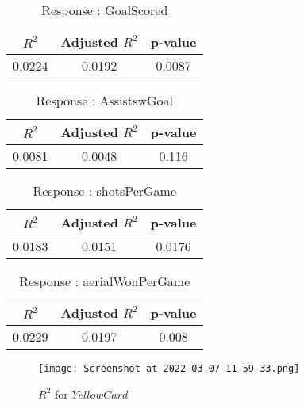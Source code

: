 \documentclass[12pt]{article}
\begin{document}
\begin{minipage}{0.5\textwidth}
	\begin{table}[H]
	\centering
	\caption{Response : GoalScored}\label{table:1a}
	{\begin{tabular}{|c|c|c|}
			\hline
			$ R^2 $ & Adjusted $ R^2 $ & p-value \\
			\hline
			0.0224 & 0.0192 & 0.0087 \\
			\hline
		\end{tabular}
	}
\end{table}
\begin{table}[H]
	\centering
	\caption{Response : AssistswGoal}\label{table:1a}
	{\begin{tabular}{|c|c|c|}
			\hline
			$ R^2 $ & Adjusted $ R^2 $ & p-value \\
			\hline
			0.0081 & 0.0048 & 0.116 \\
			\hline
		\end{tabular}
	}
\end{table}
\end{minipage}
\hfill
\begin{minipage}{0.5\textwidth}
	\begin{table}[H]
	\centering
	\caption{Response : shotsPerGame }\label{table:1a}
	{\begin{tabular}{|c|c|c|}
			\hline
			$ R^2 $ & Adjusted $ R^2 $ & p-value \\
			\hline
			0.0183 & 0.0151 & 0.0176 \\
			\hline
		\end{tabular}
	}
\end{table}
\begin{table}[H]
	\centering
	\caption{Response : aerialWonPerGame}\label{table:1a}
	{\begin{tabular}{|c|c|c|}
			\hline
			$ R^2 $ & Adjusted $ R^2 $ & p-value \\
			\hline
			0.0229 & 0.0197 & 0.008 \\
			\hline
		\end{tabular}
	}
\end{table}
\end{minipage}

\begin{figure}[H]
	\centering
	\texttt{[image: Screenshot at 2022-03-07 11-59-33.png]}
	\caption{$ R^2 $ for $ YellowCard $}
	\label{fig:1}
\end{figure}
\end{document}
